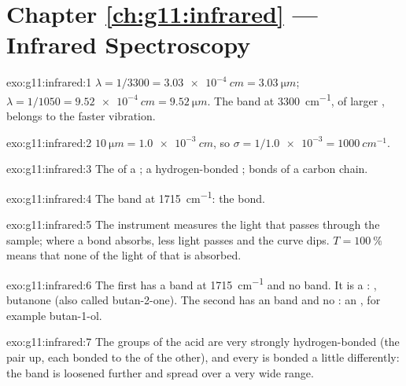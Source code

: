 \section*{Chapter \ref{ch:g11:infrared} --- Infrared Spectroscopy}

\begin{solution}{exo:g11:infrared:1}
$\lambda = 1/3300 = \qty{3.03e-4}{cm} = \qty{3.03}{\micro m}$;
$\lambda = 1/1050 = \qty{9.52e-4}{cm} = \qty{9.52}{\micro m}$. The band at
\qty{3300}{cm^{-1}}, of larger , belongs to the faster
vibration.
\end{solution}

\begin{solution}{exo:g11:infrared:2}
$\qty{10}{\micro m} = \qty{1.0e-3}{cm}$, so $\sigma = 1/\num{1.0e-3} =
\qty{1000}{cm^{-1}}$.
\end{solution}

\begin{solution}{exo:g11:infrared:3}
The  of a ; a hydrogen-bonded  ; 
bonds of a carbon chain.
\end{solution}

\begin{solution}{exo:g11:infrared:4}
The band at \qty{1715}{cm^{-1}}: the  bond.
\end{solution}

\begin{solution}{exo:g11:infrared:5}
The instrument measures the light that passes through the sample; where
a bond absorbs, less light passes and the curve dips. $T =
\qty{100}{\percent}$ means that none of the light of that  is
absorbed.
\end{solution}

\begin{solution}{exo:g11:infrared:6}
The first has a  band at \qty{1715}{cm^{-1}} and no 
band. It is a : , butanone (also called
butan-2-one). The second has an  band and no : an
, for example butan-1-ol.
\end{solution}

\begin{solution}{exo:g11:infrared:7}
The  groups of the acid are very strongly hydrogen-bonded (the
 pair up, each  bonded to the  of the other),
and every  is bonded a little differently: the band is loosened
further and spread over a very wide range.
\end{solution}

